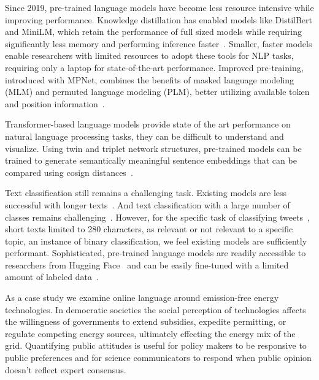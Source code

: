 Since 2019, pre-trained language models have become less resource intensive while improving performance.
Knowledge distillation has enabled models like DistilBert and MiniLM, 
which retain the performance of full sized models while requiring significantly less memory
and performing inference faster~\cite{sanh2019distilbert,wang2020minilm}. 
Smaller, faster models enable researchers with limited resources to adopt these tools for NLP tasks, requiring only a laptop for state-of-the-art performance.
Improved pre-training, introduced with MPNet,
combines the benefits of masked language modeling (MLM)
and permuted language modeling (PLM),
better utilizing available token and position information~\cite{song2020mpnet}.  

Transformer-based language models provide state of the art performance on natural language processing tasks,
they can be difficult to understand and visualize. 
Using twin and triplet network structures,
pre-trained models can be trained to generate 
semantically meaningful sentence embeddings that can be compared using cosign distances~\cite{reimers-2019-sentence-bert}.

Text classification still remains a challenging task. Existing models are less successful with longer texts~\cite{gao2021limitations}. And text classification with a large number of classes remains challenging~\cite{chang2020taming}. 
However, for the specific task of classifying tweets~\cite{antypas2022twitter}, 
short texts limited to 280 characters, 
as relevant or not relevant to a specific topic, 
an instance of binary classification,
we feel existing models are sufficiently performant.
Sophisticated, pre-trained language models are readily accessible to researchers from Hugging Face~\cite{wolf2020transformers}
and can be easily fine-tuned with a limited amount of labeled data~\cite{yan2018few,wang2020generalizing}.




As a case study we examine online language around emission-free energy technologies. 
In democratic societies the social perception of technologies
affects the willingness of governments
to extend subsidies,
expedite permitting,
or regulate competing energy sources, 
ultimately effecting the energy mix of the grid. 
Quantifying public attitudes is useful for policy makers to be responsive to public preferences
and for science communicators to respond when public opinion doesn't reflect expert consensus.

